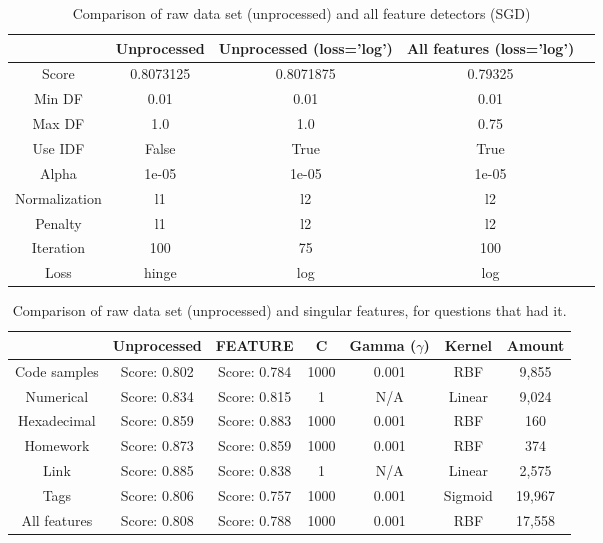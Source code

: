 \begin{table}[!h]%
	\centering
	\begin{tabular}{| c| c | c | c | c |}
		\hline
		~				& Unprocessed		& Unprocessed (loss='log')		& All features (loss='log')	\\ \hline
		Score 			& 0.8073125				& 0.8071875					& 0.79325					\\ \hline
		Min DF 			& 0.01					& 0.01						& 0.01						\\ \hline
		Max DF 			& 1.0					& 1.0						& 0.75						\\ \hline
		Use IDF			& False					& True						& True						\\ \hline
		Alpha 			& 1e-05					& 1e-05						& 1e-05						\\ \hline
		Normalization 	& l1					& l2						& l2						\\ \hline		
		Penalty 		& l1					& l2						& l2						\\ \hline
		Iteration 		& 100					& 75						& 100						\\ \hline
		Loss 			& hinge					& log						& log						\\ \hline		
	\end{tabular}
	\caption{Comparison of raw data set (unprocessed) and all feature detectors (SGD)}
	\label{tab:unprocessed_vs_all_feature_detectors_sgd_so}
\end{table}


\begin{table}[!h]%
	\centering
	\begin{tabular}{| c | c | c | c | c | c | c |}
		\hline
		~				& Unprocessed		& FEATURE		& C			& Gamma ($\gamma$)	& Kernel	& Amount	 	\\ \hline
		Code samples 	& Score: 0.802		& Score: 0.784	& 1000		& 0.001				& RBF 		& 9,855 		\\ \hline
		Numerical		& Score: 0.834		& Score: 0.815	& 1			& N/A				& Linear	& 9,024			\\ \hline
		Hexadecimal		& Score: 0.859		& Score: 0.883	& 1000		& 0.001				& RBF		& 160 			\\ \hline
		Homework 		& Score: 0.873		& Score: 0.859	& 1000		& 0.001				& RBF		& 374 			\\ \hline
		Link			& Score: 0.885		& Score: 0.838	& 1			& N/A				& Linear	& 2,575			\\ \hline
		Tags			& Score: 0.806		& Score: 0.757	& 1000		& 0.001				& Sigmoid	& 19,967		\\ \hline
		All features	& Score: 0.808		& Score: 0.788	& 1000		& 0.001				& RBF 		& 17,558		\\ \hline
	\end{tabular}
	\caption{Comparison of raw data set (unprocessed) and singular features, for questions that had it.}
	\label{tab:comparison_of_feature_occurences_only}
\end{table}


